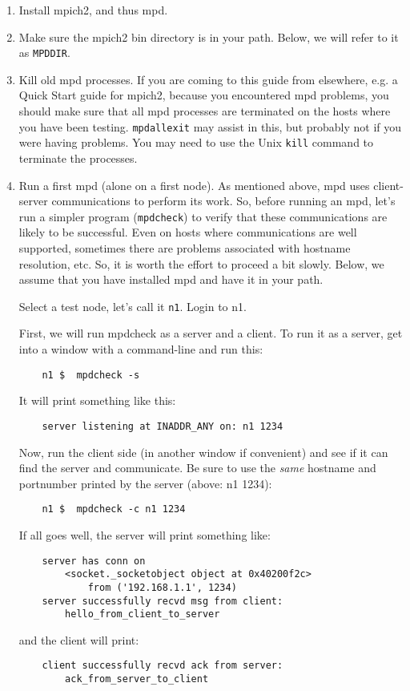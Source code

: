 \documentclass[dvipdfm,11pt]{article}
\begin{document}
\begin{enumerate}
\item Install mpich2, and thus mpd.

\item Make sure the mpich2 bin directory is in your path.
Below, we will refer to it as \texttt{MPDDIR}.

\item Kill old mpd processes.
If you are coming to this guide from elsewhere, e.g. a Quick Start guide
for mpich2, because you encountered mpd problems, you should make sure
that all mpd processes are terminated on the hosts where you have been
testing.  \texttt{mpdallexit} may assist in this, but probably not if
you were having problems.  You may need to use the Unix \texttt{kill}
command to terminate the processes.

\item Run a first mpd (alone on a first node).
As mentioned above, mpd uses client-server communications to perform
its work.  So, before running an mpd, let's run a simpler program
(\texttt{mpdcheck}) to verify that these communications are likely to be
successful.  Even on hosts where communications are well supported,
sometimes there are problems associated with hostname resolution, etc.
So, it is worth the effort to proceed a bit slowly.  Below, we assume
that you have installed mpd and have it in your path.

Select a test node, let's call it \texttt{n1}.  Login to n1.

First, we will run mpdcheck as a server and a client.  To run it as a
server, get into a window with a command-line and run this:
\begin{verbatim}
    n1 $  mpdcheck -s
\end{verbatim}
It will print something like this:
\begin{verbatim}
    server listening at INADDR_ANY on: n1 1234
\end{verbatim}

Now, run the client side (in another window if convenient) and see
if it can find the server and communicate.  Be sure to use the \emph{same}
hostname and portnumber printed by the server (above: n1 1234):
\begin{verbatim}
    n1 $  mpdcheck -c n1 1234
\end{verbatim}

If all goes well, the server will print something like:
\begin{verbatim}
    server has conn on
        <socket._socketobject object at 0x40200f2c>
            from ('192.168.1.1', 1234)
    server successfully recvd msg from client:
        hello_from_client_to_server
\end{verbatim}
and the client will print:
\begin{verbatim}
    client successfully recvd ack from server:
        ack_from_server_to_client
\end{verbatim}


\end{enumerate}
\end{document}

